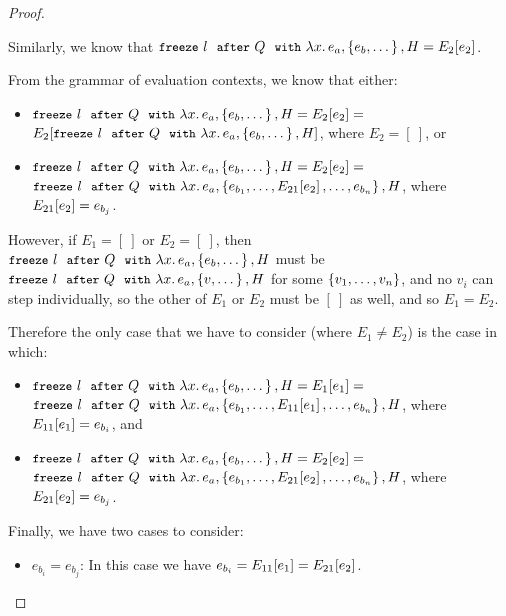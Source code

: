 \begin{proof}
\begin{itemize}
    Similarly, we know that
    $\freezeafterfull{l}{Q}{\lam{x}{e_a}}{\setof{e_b, \dots}}{H} =
    \evalctxt{E_2}{e_2}$.

    From the grammar of evaluation contexts, we know that either:
    \begin{itemize}
    \item $\freezeafterfull{l}{Q}{\lam{x}{e_a}}{\setof{e_b,
        \dots}}{H} = \evalctxt{E_2}{e_2} =$ \\
      $\evalctxt{E_2}{\freezeafterfull{l}{Q}{\lam{x}{e_a}}{\setof{e_b,
          \dots}}{H}}$, where $E_2 = [~]$, or
    \item $\freezeafterfull{l}{Q}{\lam{x}{e_a}}{\setof{e_b,
        \dots}}{H} = \evalctxt{E_2}{e_2} =$ \\
      $\freezeafterfull{l}{Q}{\lam{x}{e_a}}{\setof{e_{b_1}, \dots,
        \evalctxt{E_{21}}{e_2}, \dots, e_{b_n}}}{H}$, where
      $\evalctxt{E_{21}}{e_2} = e_{b_j}$.
    \end{itemize}

    However, if $E_1 = [~]$ or $E_2 = [~]$, then
    $\freezeafterfull{l}{Q}{\lam{x}{e_a}}{\setof{e_b, \dots}}{H}$ must
    be $\freezeafterfull{l}{Q}{\lam{x}{e_a}}{\setof{v, \dots}}{H}$ for
    some $\setof{v_1, \dots, v_n}$, and no $v_i$ can step
    individually, so the other of $E_1$ or $E_2$ must be $[~]$ as
    well, and so $E_1 = E_2$.

    Therefore the only case that we have to consider (where $E_1 \neq
    E_2$) is the case in which:
    \begin{itemize}
    \item $\freezeafterfull{l}{Q}{\lam{x}{e_a}}{\setof{e_b,
        \dots}}{H} = \evalctxt{E_1}{e_1} =$ \\
      $\freezeafterfull{l}{Q}{\lam{x}{e_a}}{\setof{e_{b_1}, \dots,
        \evalctxt{E_{11}}{e_1}, \dots, e_{b_n}}}{H}$, where
      $\evalctxt{E_{11}}{e_1} = e_{b_i}$, and
    \item $\freezeafterfull{l}{Q}{\lam{x}{e_a}}{\setof{e_b,
        \dots}}{H} = \evalctxt{E_2}{e_2} =$ \\
      $\freezeafterfull{l}{Q}{\lam{x}{e_a}}{\setof{e_{b_1}, \dots,
        \evalctxt{E_{21}}{e_2}, \dots, e_{b_n}}}{H}$, where
      $\evalctxt{E_{21}}{e_2} = e_{b_j}$.
    \end{itemize}

    Finally, we have two cases to consider:
    \begin{itemize}
    \item $e_{b_i} = e_{b_j}$: In this case we have $e_{b_i} =
      \evalctxt{E_{11}}{e_1} = \evalctxt{E_{21}}{e_2}$.


\end{itemize}
\end{itemize}
\end{proof}
